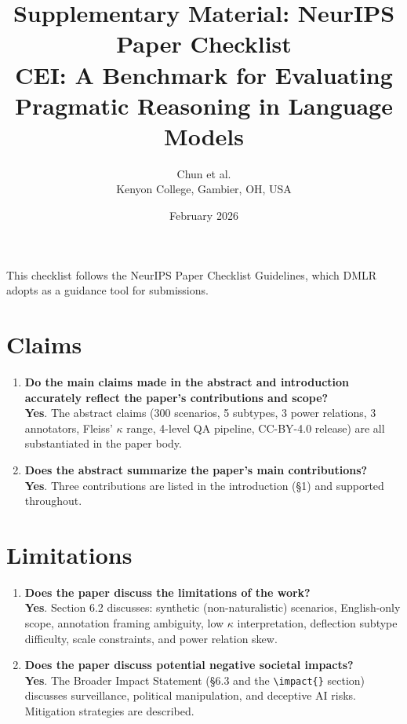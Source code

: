 \documentclass[11pt]{article}
\title{Supplementary Material: NeurIPS Paper Checklist\\[0.5em]
\large CEI: A Benchmark for Evaluating Pragmatic Reasoning in Language Models}
\author{Chun et al.\\Kenyon College, Gambier, OH, USA}
\date{February 2026}
\newcommand{\yes}{\textcolor{green!60!black}{\textbf{Yes}}}
\begin{document}
\maketitle

\noindent This checklist follows the NeurIPS Paper Checklist Guidelines, which DMLR adopts as a guidance tool for submissions.

\section{Claims}

\begin{enumerate}[leftmargin=*]
    \item \textbf{Do the main claims made in the abstract and introduction accurately reflect the paper's contributions and scope?} \\
    \yes. The abstract claims (300 scenarios, 5 subtypes, 3 power relations, 3 annotators, Fleiss' $\kappa$ range, 4-level QA pipeline, CC-BY-4.0 release) are all substantiated in the paper body.

    \item \textbf{Does the abstract summarize the paper's main contributions?} \\
    \yes. Three contributions are listed in the introduction (\S1) and supported throughout.
\end{enumerate}

\section{Limitations}

\begin{enumerate}[leftmargin=*]
    \item \textbf{Does the paper discuss the limitations of the work?} \\
    \yes. Section 6.2 discusses: synthetic (non-naturalistic) scenarios, English-only scope, annotation framing ambiguity, low $\kappa$ interpretation, deflection subtype difficulty, scale constraints, and power relation skew.

    \item \textbf{Does the paper discuss potential negative societal impacts?} \\
    \yes. The Broader Impact Statement (\S6.3 and the \texttt{\textbackslash impact\{\}} section) discusses surveillance, political manipulation, and deceptive AI risks. Mitigation strategies are described.
\end{enumerate}
\end{document}

